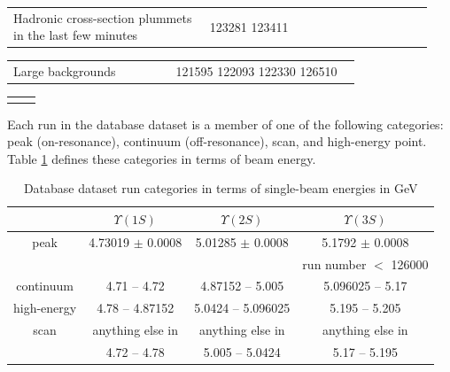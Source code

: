 \begin{table}[!ht]
  \noindent \begin{tabular}{p{0.44\linewidth} p{0.50\linewidth}}
    Hadronic cross-section plummets in the last few minutes & 123281
    123411 \\
  \end{tabular}

  \noindent \begin{tabular}{p{0.44\linewidth} p{0.50\linewidth}}
    Large backgrounds & 121595 122093 122330 126510 \\
  \end{tabular}

  \noindent \begin{tabular}{p{0.44\linewidth} p{0.50\linewidth}}
     & \\
  \end{tabular}
\end{table}

Each run in the database dataset is a member of one of the following
categories: peak (on-resonance), continuum (off-resonance), scan, and
high-energy point.  Table \ref{datasets_runclassification} defines
these categories in terms of beam energy.

\begin{table}
  \caption{\label{datasets_runclassification} Database dataset run
  categories in terms of single-beam energies in GeV}
  \begin{center}
    \begin{tabular}{c c c c}
      & $\Upsilon(1S)$ & $\Upsilon(2S)$ & $\Upsilon(3S)$ \\\hline
      peak & 4.73019 $\pm$ 0.0008 & 5.01285 $\pm$ 0.0008 & 5.1792 $\pm$ 0.0008 \\
           &                      &                      & run number $<$ 126000 \\
      continuum & 4.71 -- 4.72    & 4.87152 -- 5.005     & 5.096025 -- 5.17 \\
      high-energy & 4.78 -- 4.87152 & 5.0424 -- 5.096025 & 5.195 -- 5.205 \\
      scan & anything else in     & anything else in     & anything else in \\
           & 4.72 -- 4.78         & 5.005 -- 5.0424      & 5.17 -- 5.195 \\\hline
    \end{tabular}
  \end{center}
\end{table}

